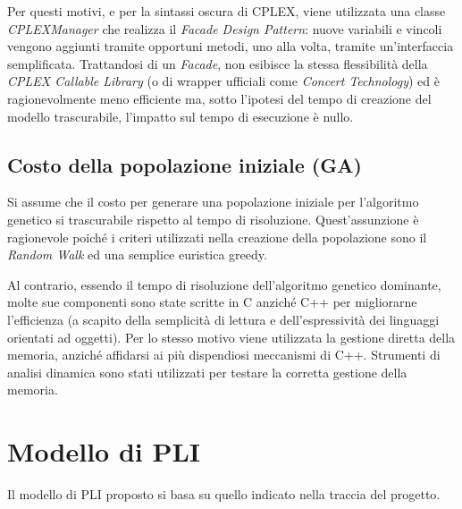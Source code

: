 \documentclass[a4paper, 10pt]{report}
\begin{document}
Per questi motivi, e per la sintassi oscura di CPLEX, viene utilizzata una
classe \emph{CPLEXManager} che realizza il \emph{Facade Design Pattern}:
nuove variabili e vincoli vengono aggiunti tramite opportuni metodi, uno
alla volta, tramite un'interfaccia semplificata.
Trattandosi di un \emph{Facade}, non esibisce la stessa
flessibilità della \emph{CPLEX Callable Library} (o di wrapper ufficiali
come \emph{Concert Technology}) ed è ragionevolmente meno efficiente ma,
sotto l'ipotesi del tempo di creazione del modello trascurabile, l'impatto
sul tempo di esecuzione è nullo.



\section{Costo della popolazione iniziale (GA)}
\label{sec:assumptions_GA}
Si assume che il costo per generare una popolazione iniziale per
l'algoritmo genetico si trascurabile rispetto al tempo di risoluzione.
Quest'assunzione è ragionevole poiché i criteri utilizzati nella creazione
della popolazione sono il \emph{Random Walk} ed una semplice euristica
greedy.

Al contrario, essendo il tempo di risoluzione dell'algoritmo genetico
dominante, molte sue componenti sono state scritte in C anziché C++ per
migliorarne l'efficienza (a scapito della semplicità di lettura e
dell'espressività dei linguaggi orientati ad oggetti). Per lo stesso
motivo viene utilizzata la gestione diretta della memoria, anziché
affidarsi ai più dispendiosi meccanismi di C++. Strumenti di analisi
dinamica sono stati utilizzati per testare la corretta gestione della
memoria.



\chapter{Modello di PLI}
Il modello di PLI proposto si basa su quello indicato nella traccia del
progetto.
\end{document}
